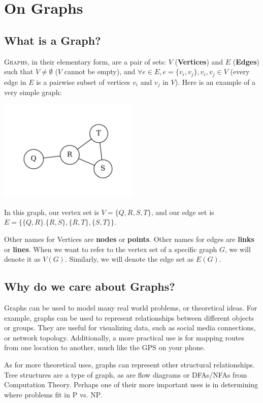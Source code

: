 \chapter{On Graphs}
\section{What is a Graph?}
\lettrine[lines=4]{G}{raphs}, in their elementary form, are a pair of sets: $V$ (\textbf{Vertices}) and $E$ (\textbf{Edges}) such that $V \neq \emptyset$ ($V$ cannot be empty), and $\forall e \in E, e = \{v_i, v_j\}, v_i, v_j \in V$ (every edge in $E$ is a pairwise subset of vertices $v_i$ and $v_j$ in $V$). Here is an example of a very simple graph:

\begin{center}
    \includegraphics[width=0.5\textwidth]{Chapter1/graph.pdf}
\end{center}

In this graph, our vertex set is $V = \{Q, R, S, T\}$, and our edge set is $E = \big\{\{Q, R\}. \{R, S\}, \{R, T\}, \{S,T\}\big\}$.

Other names for Vertices are \textbf{nodes} or \textbf{points}. Other names for edges are \textbf{links} or \textbf{lines}. When we want to refer to the vertex set of a specific graph $G$, we will denote it as $V(G)$. Similarly, we will denote the edge set as $E(G)$.
\section{Why do we care about Graphs?}
Graphs can be used to model many real world problems, or theoretical ideas. For example, graphs can be used to represent relationships between different objects or groups. They are useful for visualizing data, such as social media connections, or network topology. Additionally, a more practical use is for mapping routes from one location to another, much like the GPS on your phone.

As for more theoretical uses, graphs can represent other structural relationships. Tree structures are a type of graph, as are flow diagrams or DFAs/NFAs from Computation Theory. Perhaps one of their more important uses is in determining where problems fit in P vs. NP.


